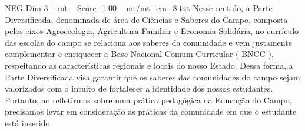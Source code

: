 \begin{textsample}{NEG Dim 3 – mt – Score -1.00 – mt/mt\_em\_8.txt}
Nesse sentido, a Parte Diversificada, denominada de área de Ciências e Saberes do Campo, composta pelos eixos Agroecologia, Agricultura Familiar e Economia Solidária, no currículo das escolas do campo se relaciona aos saberes da comunidade e vem justamente complementar e enriquecer a Base Nacional Comum Curricular ( BNCC ), respeitando as características regionais e locais do nosso Estado.
Dessa forma, a Parte Diversificada visa garantir que os saberes das comunidades do campo sejam valorizados com o intuito de fortalecer a identidade dos nossos estudantes.
Portanto, ao refletirmos sobre uma prática pedagógica na Educação do Campo, precisamos levar em consideração as práticas da comunidade em que o estudante está inserido.

\end{textsample}
